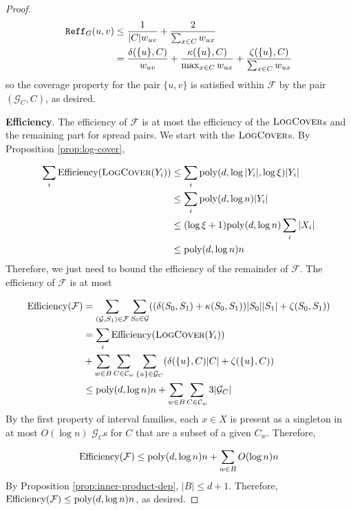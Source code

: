 \begin{proof}
\begin{align*}
    \mathtt{Reff}_G(u,v) &\le \frac{1}{|C| w_{uv}} + \frac{2}{\sum_{x\in C} w_{ux}}\\
    &= \frac{\delta(\{u\},C)}{w_{uv}} + \frac{\kappa(\{u\},C)}{\max_{x\in C} w_{ux}} + \frac{\zeta(\{u\},C)}{\sum_{x\in C} w_{ux}}\\
\end{align*}
so the coverage property for the pair $\{u,v\}$ is satisfied within $\mathcal F$ by the pair $(\mathcal G_C, C)$, as desired.

\textbf{Efficiency}. The efficiency of $\mathcal F$ is at most the efficiency of the $\textsc{LogCover}$s and the remaining part for spread pairs. We start with the $\textsc{LogCover}$s. By Proposition \ref{prop:log-cover},

\begin{align*}
    \sum_i \text{Efficiency}(\textsc{LogCover}(Y_i)) &\le \sum_i \mathrm{poly}(d,\log |Y_i|,\log \xi) |Y_i|\\
    &\le \sum_i \mathrm{poly}(d,\log n) |Y_i|\\
    &\le (\log \xi + 1) \mathrm{poly}(d,\log n) \sum_i |X_i|\\
    &\le \mathrm{poly}(d,\log n) n\\
\end{align*}
Therefore, we just need to bound the efficiency of the remainder of $\mathcal F$. The efficiency of $\mathcal F$ is at most

\begin{align*}
    \text{Efficiency}(\mathcal F) &= \sum_{(\mathcal G,S_1)\in \mathcal F} \sum_{S_0\in \mathcal G} ((\delta(S_0,S_1) + \kappa(S_0,S_1))|S_0||S_1| + \zeta(S_0,S_1))\\
    &= \sum_i \text{Efficiency}(\textsc{LogCover}(Y_i))\\
    &+ \sum_{w\in B}\sum_{C\in \mathcal C_w}\sum_{\{u\}\in \mathcal G_C} (\delta(\{u\},C)|C| + \zeta(\{u\},C))\\
    &\le \mathrm{poly}(d,\log n) n + \sum_{w\in B}\sum_{C\in \mathcal C_w} 3|\mathcal G_C|\\
\end{align*}
By the first property of interval families, each $x\in X$ is present as a singleton in at most $O(\log n)$ $\mathcal G_C$s for $C$ that are a subset of a given $C_w$. Therefore,

$$\text{Efficiency}(\mathcal F)\le \mathrm{poly}(d,\log n) n + \sum_{w\in B} O(\log n) n$$
By Proposition \ref{prop:inner-product-dep}, $|B|\le d+1$. Therefore, $\text{Efficiency}(\mathcal F)\le \mathrm{poly}(d,\log n) n$, as desired.


\end{proof}
